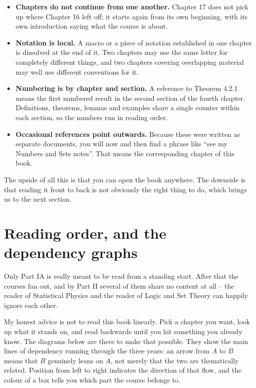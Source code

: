 \begin{itemize}
	\item \textbf{Chapters do not continue from one another.} Chapter 17 does not pick up
	where Chapter 16 left off; it starts again from its own beginning, with its own
	introduction saying what the course is about.

	\item \textbf{Notation is local.} A macro or a piece of notation established in one
	chapter is dissolved at the end of it. Two chapters may use the same letter for
	completely different things, and two chapters covering overlapping material may
	well use different conventions for it.

	\item \textbf{Numbering is by chapter and section.} A reference to Theorem 4.2.1 means
	the first numbered result in the second section of the fourth chapter. Definitions,
	theorems, lemmas and examples share a single counter within each section, so the
	numbers run in reading order.

	\item \textbf{Occasional references point outwards.} Because these were written as
	separate documents, you will now and then find a phrase like ``see my Numbers and
	Sets notes''. That means the corresponding chapter of this book.
\end{itemize}

The upside of all this is that you can open the book anywhere. The downside is that
reading it front to back is not obviously the right thing to do, which brings us to the
next section.

\section*{Reading order, and the dependency graphs}

Only Part IA is really meant to be read from a standing start. After that the courses
fan out, and by Part II several of them share no content at all -- the reader of
Statistical Physics and the reader of Logic and Set Theory can happily ignore each
other.

My honest advice is not to read this book linearly. Pick a chapter you want, look up
what it stands on, and read backwards until you hit something you already know. The
diagrams below are there to make that possible. They show the main lines of dependency
running through the three years: an arrow from $A$ to $B$ means that $B$ genuinely
leans on $A$, not merely that the two are thematically related. Position from left to
right indicates the direction of that flow, and the colour of a box tells you which
part the course belongs to.

